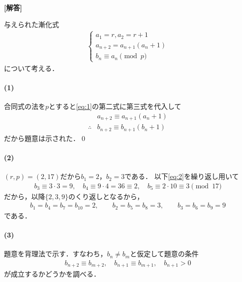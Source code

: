 \documentclass[../../main.tex]{subfiles}
\begin{document}
\begin{oframed}
  
\end{oframed}

{\bf [解答]}

与えられた漸化式
\begin{align}
  \begin{cases}
    a_1=r, a_2=r+1 \\
    a_{n+2}=a_{n+1}(a_n+1) \\
    b_{n} \equiv a_{n} \pmod p
  \end{cases} \label{eq:1}
\end{align}
について考える．

\paragraph{(1)}

合同式の法を$p$とすると\cref{eq:1}の第二式に第三式を代入して
\begin{align}
  & a_{n+2} \equiv a_{n+1}(a_n+1) \\
  \therefore
  & b_{n+2} \equiv b_{n+1}(b_n+1) \label{eq:2}
\end{align}
だから題意は示された．\qed

\paragraph{(2)}

$(r,p)=(2,17)$だから$b_1=2$，$b_2=3$である．
以下\cref{eq:2}を繰り返し用いて
\begin{align}
  b_3\equiv3\cdot3=9,\quad
  b_4\equiv9\cdot4=36\equiv 2,\quad
  b_5\equiv2\cdot10\equiv3 \pmod{17}
\end{align}
だから，以降$\{2,3,9\}$のくり返しとなるから，
\begin{align}
  b_1=b_4=b_7=b_{10}=2,\qquad b_2=b_5=b_8=3,\qquad b_3=b_6=b_9=9
\end{align}
である．

\paragraph{(3)}

題意を背理法で示す．すなわち，$b_n\ne b_m$と仮定して題意の条件
\begin{align}
  b_{n+2} \equiv b_{m+2}, \quad
  b_{n+1} \equiv b_{m+1}, \quad
  b_{n+1} > 0 \label{eq:3}
\end{align}
が成立するかどうかを調べる．
\end{document}
